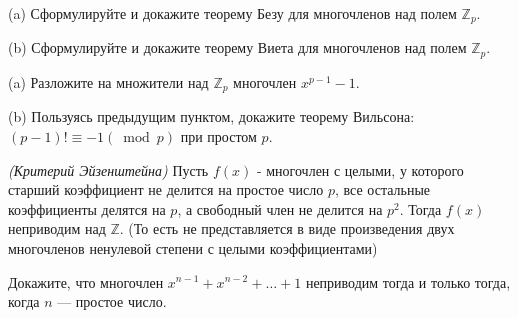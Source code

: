 (a) Сформулируйте и докажите теорему Безу для многочленов над полем $\mathbb{Z}_p$.

(b) Сформулируйте и докажите теорему Виета для многочленов над полем $\mathbb{Z}_p$.

(a) Разложите на множители над $\mathbb{Z}_p$ многочлен $x^{p-1}-1$.

(b) Пользуясь предыдущим пунктом, докажите теорему Вильсона:
$(p-1)!\equiv-1(\bmod p)$ при простом $p$.

\textit{(Критерий Эйзенштейна)}
Пусть $f(x)$ - многочлен с целыми, у которого старший коэффициент не делится на простое число $p$, все остальные коэффициенты делятся на $p$, а свободный член не делится на $p^2$. Тогда $f(x)$ неприводим над $\mathbb{Z}$. (То есть не представляется в виде произведения двух многочленов ненулевой степени с целыми коэффициентами)

Докажите, что многочлен $x^{n-1}+x^{n-2}+\ldots+1$ неприводим тогда и только тогда, когда $n$ --- простое число.